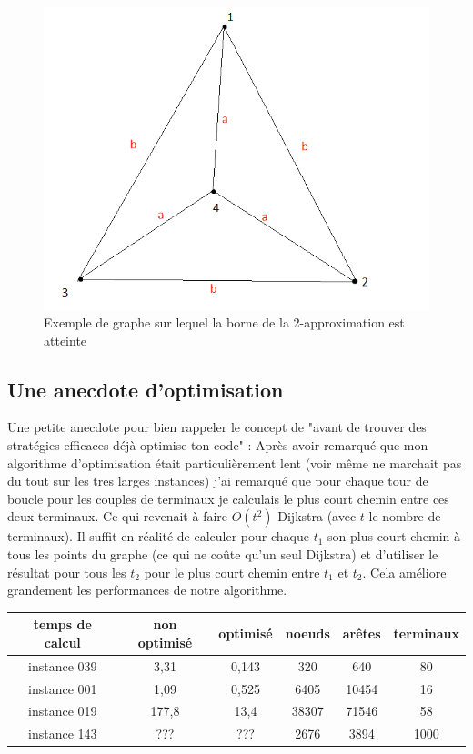 \documentclass[10pt,a4paper]{article}
\begin{document}
\begin{figure}
\includegraphics[scale=.5]{images/exemple_borne}
\caption{Exemple de graphe sur lequel la borne de la 2-approximation est atteinte}
\label{exborne}
\end{figure}

\subsection{Une anecdote d'optimisation}
Une petite anecdote pour bien rappeler le concept de "avant de trouver des stratégies efficaces déjà optimise ton code" :
Après avoir remarqué que mon algorithme d'optimisation était particulièrement lent (voir même ne marchait pas du tout sur les tres larges instances) j'ai remarqué que pour chaque tour de boucle pour les couples de terminaux je calculais le plus court chemin entre ces deux terminaux. Ce qui revenait à faire $O(t^2)$ Dijkstra (avec $t$ le nombre de terminaux).  Il suffit en réalité de calculer pour chaque $t_1$ son plus court chemin à tous les points du graphe (ce qui ne coûte qu'un seul Dijkstra) et d'utiliser le résultat pour tous les $t_2$ pour le plus court chemin entre $t_1$ et $t_2$. Cela améliore grandement les performances de notre algorithme. 

\begin{tabular}{|c|c|c|c|c|c|}
\hline 
temps de calcul & non optimisé & optimisé & noeuds & arêtes & terminaux \\ 
\hline 
instance 039 & 3,31 & 0,143 & 320 & 640 & 80 \\ 
\hline 
instance 001 & 1,09 & 0,525 & 6405 & 10454 & 16 \\ 
\hline 
instance 019 & 177,8 & 13,4 & 38307 & 71546 & 58 \\ 
\hline 
instance 143 & ???   & ???  & 2676 & 3894 & 1000 \\
\hline 
\end{tabular} 
\end{document}
